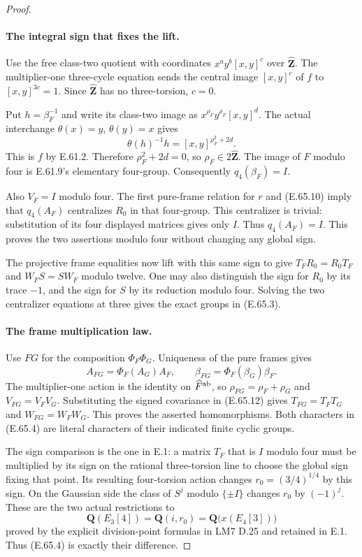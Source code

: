 \begin{proof}
\paragraph{The integral sign that fixes the lift.}
Use the free class-two quotient with coordinates
$x^a y^b[x,y]^c$ over $\widehat{\mathbf Z}$. The multiplier-one
three-cycle equation sends the central image $[x,y]^c$ of $f$
to $[x,y]^{3c}=1$. Since $\widehat{\mathbf Z}$ has no
three-torsion, $c=0$.

Put $h=\beta_F^{-1}$ and write its class-two image as
$x^{\rho_F}y^{\rho_F}[x,y]^d$. The actual interchange
$\theta(x)=y$, $\theta(y)=x$ gives
\[
 \theta(h)^{-1}h=[x,y]^{\rho_F^2+2d}.
 \tag{E.65.11}
\]
This is $f$ by E.61.2. Therefore $\rho_F^2+2d=0$, so
$\rho_F\in2\widehat{\mathbf Z}$. The image of $\widehat F$
modulo four is E.61.9's elementary four-group. Consequently
$q_4(\beta_F)=I$.

Also $V_F=I$ modulo four. The first pure-frame relation for $r$
and \textup{(E.65.10)} imply that $q_4(A_F)$ centralizes
$R_0$ in that four-group. This centralizer is trivial: substitution
of its four displayed matrices gives only $I$. Thus $q_4(A_F)=I$.
This proves the two assertions modulo four without changing any
global sign.

The projective frame equalities now lift with this same sign to
give $T_FR_0=R_0T_F$ and $W_FS=SW_F$ modulo twelve. One may
also distinguish the sign for $R_0$ by its trace $-1$, and the
sign for $S$ by its reduction modulo four. Solving the two
centralizer equations at three gives the exact groups in
\textup{(E.65.3)}.

\paragraph{The frame multiplication law.}
Use $FG$ for the composition $\Phi_F\Phi_G$.
Uniqueness of the pure frames gives
\[
 A_{FG}=\Phi_F(A_G)A_F,\qquad
 \beta_{FG}=\Phi_F(\beta_G)\beta_F.
 \tag{E.65.12}
\]
The multiplier-one action is the identity on $\widehat F^{\rm ab}$,
so $\rho_{FG}=\rho_F+\rho_G$ and $V_{FG}=V_FV_G$.
Substituting the signed covariance in \textup{(E.65.12)} gives
$T_{FG}=T_FT_G$ and $W_{FG}=W_FW_G$. This proves the asserted
homomorphisms. Both characters in \textup{(E.65.4)} are literal
characters of their indicated finite cyclic groups.

The sign comparison is the one in E.1: a matrix $T_F$ that is $I$
modulo four must be multiplied by its sign on the rational
three-torsion line to choose the global sign fixing that point.
Its resulting four-torsion action changes $r_0=(3/4)^{1/4}$
by this sign. On the Gaussian side the class of $S^j$ modulo
$\{\pm I\}$ changes $r_0$ by $(-1)^j$. These are the two
actual restrictions to
\[
 \mathbf Q(E_3[4])=\mathbf Q(i,r_0)
              =\mathbf Q\bigl(x(E_4[3])\bigr)
 \tag{E.65.13}
\]
proved by the explicit division-point formulas in LM7 D.25 and
retained in E.1. Thus \textup{(E.65.4)} is exactly their difference.


\end{proof}
